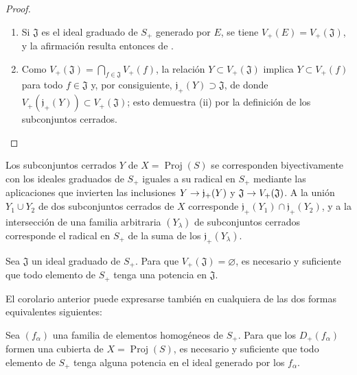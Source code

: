 \documentclass[oneside,10pt]{amsart}
\makeatletter
\newcommand{\ega@arrow}[2]{\mathchoice{#1}{#2}{#2}{#2}}
\renewcommand{\to}{\ega@arrow{\longrightarrow}{\rightarrow}}
\newcommand{\oldpage}[2][]{\marginnote{\normalfont\footnotesize\textbf{#1}~|~#2}\ignorespaces}
\let\EGAOriginalLabel\label
\renewcommand{\label}[1]{\phantomsection\EGAOriginalLabel{#1}}
\makeatother
\begin{document}
\begin{proof}
\medskip\noindent
\begin{enumerate}
  \item[\rm(i)] Si $\mathfrak{J}$ es el ideal graduado de $S_+$ generado por $E$, se tiene $V_+(E)=V_+(\mathfrak{J})$, y la afirmación resulta entonces de .
  \item[\rm(ii)] Como $V_+(\mathfrak{J})=\bigcap_{f\in\mathfrak{J}}V_+(f)$, la relación $Y\subset V_+(\mathfrak{J})$ implica $Y\subset V_+(f)$ para todo $f\in\mathfrak{J}$ y, por consiguiente, $\mathfrak{j}_+(Y)\supset\mathfrak{J}$, de donde $V_+(\mathfrak{j}_+(Y))\subset V_+(\mathfrak{J})$; esto demuestra (ii) por la definición de los subconjuntos cerrados.
\end{enumerate}
\end{proof}

\begin{corollary}[2.3.12]
\label{II.2.3.12-fr}
Los subconjuntos cerrados $Y$ de $X=\operatorname{Proj}(S)$ se corresponden biyectivamente con los ideales graduados de $S_+$ iguales a su radical en $S_+$ mediante las aplicaciones que invierten las inclusiones $Y\to\mathfrak{j}_+(Y)$ y $\mathfrak{J}\to
V_+(\mathfrak{J})$.
A la unión $Y_1\cup Y_2$ de dos subconjuntos cerrados de $X$ corresponde
\oldpage[II]{28}
$\mathfrak{j}_+(Y_1)\cap\mathfrak{j}_+(Y_2)$, y a la intersección de una familia arbitraria $(Y_\lambda)$ de subconjuntos cerrados corresponde el radical en $S_+$ de la suma de los $\mathfrak{j}_+(Y_\lambda)$.
\end{corollary}

\begin{corollary}[2.3.13]
\label{II.2.3.13-fr}
Sea $\mathfrak{J}$ un ideal graduado de $S_+$.
Para que $V_+(\mathfrak{J})=\varnothing$, es necesario y suficiente que todo elemento de $S_+$ tenga una potencia en $\mathfrak{J}$.
\end{corollary}

El corolario anterior puede expresarse también en cualquiera de las dos formas equivalentes siguientes:

\begin{corollary}[2.3.14]
Sea $(f_\alpha)$ una familia de elementos homogéneos de $S_+$.
Para que los $D_+(f_\alpha)$ formen una cubierta de $X=\operatorname{Proj}(S)$, es necesario y suficiente que todo elemento de $S_+$ tenga alguna potencia en el ideal generado por los $f_\alpha$.
\label{II.2.3.14-fr}
\end{corollary}
\end{document}
